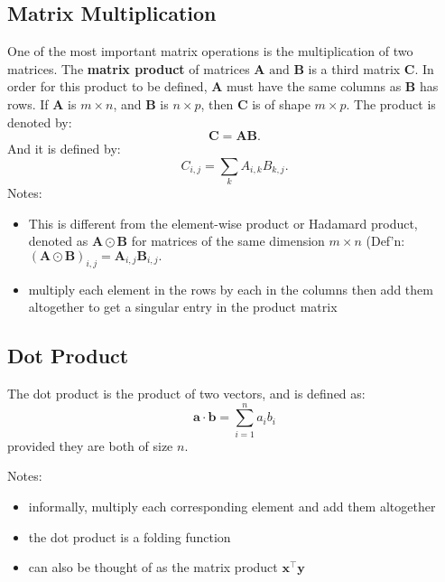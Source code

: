 \documentclass[11pt,twocolumn]{report}
\begin{document}
\subsection{Matrix Multiplication}
One of the most important matrix operations is the multiplication of two matrices. The
\textbf{matrix product} of matrices $\bm{A} \text{ and } \bm{B}$ is a third
matrix $\bm{C}$. In order for this product to be defined, $\bm{A}$ must have
the same columns as $\bm{B}$ has rows. If $\bm{A}$ is $m \times n$, and
$\bm{B}$ is $n \times p$, then $\bm{C}$ is of shape $m \times p$.
The product is denoted by:
\begin{equation}
  \bm{C} = \bm{A}\bm{B}.
\end{equation}
And it is defined by:
\begin{equation}
  C_{i, j} = \sum_k A_{i, k}B_{k, j}.
\end{equation}
Notes:
\begin{itemize}
  \item This is different from the element-wise product or Hadamard product,
    denoted as $\bm{A} \odot \bm{B}$ for matrices of the same dimension $m \times
    n$ (Def'n: $(\bm{A} \odot \bm{B})_{i, j} = \bm{A}_{i, j}\bm{B}_{i, j}.$
  \item multiply each element in the rows by each in the columns then add them
    altogether to get a singular entry in the product matrix
\end{itemize}
\subsection{Dot Product}
The dot product is the product of two vectors, and is defined as:
\begin{equation}
  \bm{a} \cdot \bm{b} = \sum_{i = 1}^n a_ib_i
\end{equation}
provided they are both of size $n$.\par
Notes:
\begin{itemize}
  \item informally, multiply each corresponding element and add them altogether
  \item the dot product is a folding function
  \item can also be thought of as the matrix product $\bm{x}^\intercal\bm{y}$
\end{itemize}
\end{document}
